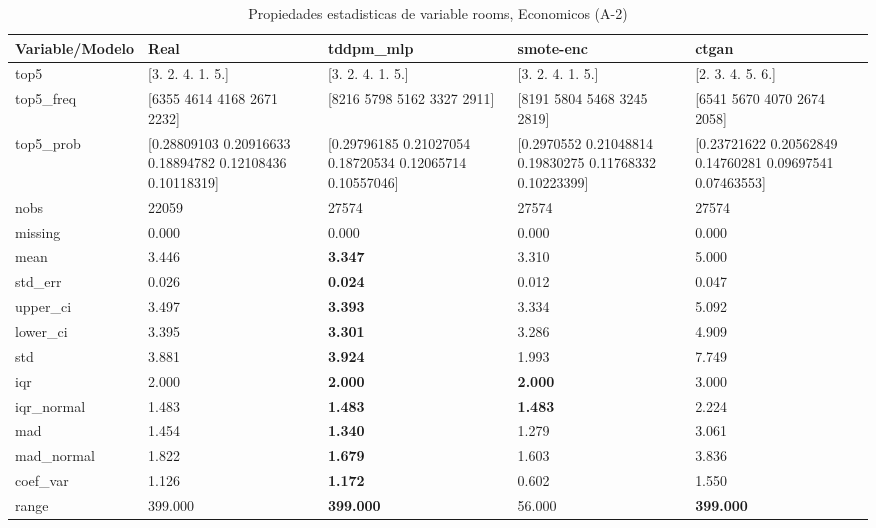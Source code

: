 \begin{table}[H]
\centering
\fontsize{8}{14}\selectfont
\caption{Propiedades  estadisticas de variable rooms, Economicos (A-2)}
\label{table-stats-economicos-a-2-rooms}
\begin{tabular}{|l|m{10em}|m{10em}|m{10em}|m{10em}|}
\hline
 \rowcolor[gray]{0.8}
Variable/Modelo & Real & tddpm\_mlp & smote-enc & ctgan \\
\hline top5 & [3. 2. 4. 1. 5.] & [3. 2. 4. 1. 5.] & [3. 2. 4. 1. 5.] & [2. 3. 4. 5. 6.] \\
\hline top5\_freq & [6355 4614 4168 2671 2232] & [8216 5798 5162 3327 2911] & [8191 5804 5468 3245 2819] & [6541 5670 4070 2674 2058] \\
\hline top5\_prob & [0.28809103 0.20916633 0.18894782 0.12108436 0.10118319] & [0.29796185 0.21027054 0.18720534 0.12065714 0.10557046] & [0.2970552  0.21048814 0.19830275 0.11768332 0.10223399] & [0.23721622 0.20562849 0.14760281 0.09697541 0.07463553] \\
\hline nobs & 22059 & 27574 & 27574 & 27574 \\
\hline missing & 0.000 & 0.000 & 0.000 & 0.000 \\
\hline mean & 3.446 & \bfseries 3.347 & 3.310 & \cellcolor[rgb]{0.9, 0.54, 0.52} 5.000 \\
\hline std\_err & 0.026 & \bfseries 0.024 & 0.012 & \cellcolor[rgb]{0.9, 0.54, 0.52} 0.047 \\
\hline upper\_ci & 3.497 & \bfseries 3.393 & 3.334 & \cellcolor[rgb]{0.9, 0.54, 0.52} 5.092 \\
\hline lower\_ci & 3.395 & \bfseries 3.301 & 3.286 & \cellcolor[rgb]{0.9, 0.54, 0.52} 4.909 \\
\hline std & 3.881 & \bfseries 3.924 & 1.993 & \cellcolor[rgb]{0.9, 0.54, 0.52} 7.749 \\
\hline iqr & 2.000 & \bfseries 2.000 & \bfseries 2.000 & \cellcolor[rgb]{0.9, 0.54, 0.52} 3.000 \\
\hline iqr\_normal & 1.483 & \bfseries 1.483 & \bfseries 1.483 & \cellcolor[rgb]{0.9, 0.54, 0.52} 2.224 \\
\hline mad & 1.454 & \bfseries 1.340 & 1.279 & \cellcolor[rgb]{0.9, 0.54, 0.52} 3.061 \\
\hline mad\_normal & 1.822 & \bfseries 1.679 & 1.603 & \cellcolor[rgb]{0.9, 0.54, 0.52} 3.836 \\
\hline coef\_var & 1.126 & \bfseries 1.172 & \cellcolor[rgb]{0.9, 0.54, 0.52} 0.602 & 1.550 \\
\hline range & 399.000 & \bfseries 399.000 & \cellcolor[rgb]{0.9, 0.54, 0.52} 56.000 & \bfseries 399.000 \\

\end{tabular}
\end{table}
